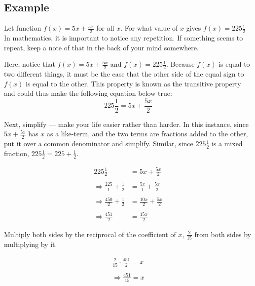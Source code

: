 \subsection{Example}
\label{sss:exam-1a79}




Let function $f(x)=5x+\frac{5x}{2}$ for all $x$. For what value of $x$ gives
$f(x)=225\frac{1}{2}$ In mathematics, it is important to notice any repetition. If
something seems to repeat, keep a note of that in the back of your mind somewhere.



Here, notice that $f(x)=5x+\frac{5x}{2}$ and $f(x)=225\frac{1}{2}$. Because $f(x)$ is
equal to two different things, it must be the case that the other side of the equal sign
to $f(x)$ is equal to the other. This property is known as the transitive property and
could thus make the following equation below true:$$225\frac{1}{2}=5x+\frac{5x}{2}$$



Next, simplify --- make your life easier rather than harder. In this instance, since
$5x+\frac{5x}{2}$ has $x$ as a like-term, and the two terms are fractions added to the
other, put it over a common denominator and simplify. Similar, since $225\frac{1}{2}$ is a
mixed fraction, $225\frac{1}{2}=225+\frac{1}{2}$.



\begin{align} 225\frac{1}{2} &= 5x + \frac{5x}{2} \\ \\ \Rightarrow \frac{225}{1} + \frac{1}{2} &= \frac{5x}{1} + \frac{5x}{2} \\ \\ \Rightarrow \frac{450}{2} + \frac{1}{2} &= \frac{10x}{2} + \frac{5x}{2} \\ \\ \Rightarrow \frac{451}{2} &= \frac{15x}{2} \end{align}





Multiply both sides by the reciprocal of the coefficient of $x$, $\frac{2}{15}$ from both
sides by multiplying by it.

\begin{align} \frac{2}{15} \cdot \frac{451}{2} = x \\ \\ \Rightarrow \frac{451}{15} = x \end{align}





